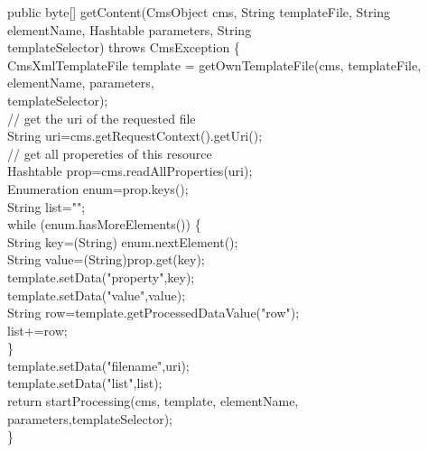 \begin{java}
public byte[] getContent(CmsObject cms, String templateFile, String\\
\jtaba   elementName, Hashtable parameters, String\\
\jtaba   templateSelector) throws CmsException \{\\

CmsXmlTemplateFile template = getOwnTemplateFile(cms, templateFile,\\
\jtabe                              elementName, parameters,\\
\jtaba   templateSelector);\\

\jtaba        // get the uri of the requested file\\
\jtaba        String uri=cms.getRequestContext().getUri();\\

\jtaba        // get all propereties of this resource\\
\jtaba        Hashtable prop=cms.readAllProperties(uri);\\

\jtaba        Enumeration enum=prop.keys();\\

\jtaba        String list="";\\

\jtaba        while (enum.hasMoreElements()) \{\\
\jtabc            String key=(String) enum.nextElement();\\
\jtabc            String value=(String)prop.get(key);\\

\jtabc            template.setData("property",key);\\
\jtabc            template.setData("value",value);\\
\jtabb         String row=template.getProcessedDataValue("row");\\
\jtabc            list+=row;\\

\jtaba        \}\\


\jtaba        template.setData("filename",uri);\\
\jtaba        template.setData("list",list);\\

\jtaba        return startProcessing(cms, template, elementName, parameters,templateSelector);\\
\}\\
\end{java}

